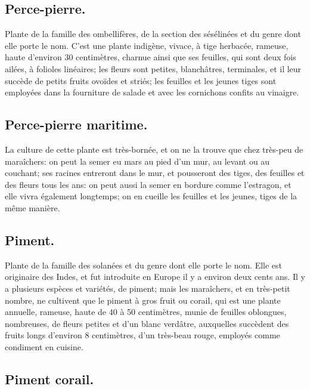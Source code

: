 \documentclass[10pt,a4paper]{book}
\begin{document}
\subsection{Perce-pierre.}

Plante de la famille des ombellifères, de la section des sésélinées et du genre dont elle porte le nom. C'est une plante indigène, vivace, à tige herbacée, rameuse, haute d'environ 30 centimètres, charnue ainsi que ses feuilles, qui sont deux fois ailées, à folioles linéaires; les fleurs sont petites, blanchâtres, terminales, et il leur succède de petits fruits ovoïdes et striés; les feuilles et les jeunes tiges sont employées dans la fourniture de salade et avec les cornichons confits au vinaigre.

\subsection{Perce-pierre maritime.}

La culture de cette plante est très-bornée, et on ne la trouve que chez très-peu de maraîchers: on peut la semer eu mars au pied d'un mur, au levant ou au couchant; ses racines entreront dans le mur, et pousseront des tiges, des feuilles et des fleurs tous les ans: on peut aussi la semer en bordure comme l'estragon, et elle vivra également longtemps; on en cueille les feuilles et les jeunes, tiges de la même manière.

\subsection{Piment.}

Plante de la famille des solanées et du genre dont elle porte le nom. Elle est originaire des Indes, et fut introduite en Europe il y a environ deux cents ans. Il y a plusieurs espèces et variétés, de piment; mais les maraîchers, et en très-petit nombre, ne cultivent que le piment à gros fruit ou corail, qui est une plante annuelle, rameuse, haute de 40 à 50 centimètres, munie de feuilles oblongues, nombreuses, de fleurs petites et d'un blanc verdâtre, auxquelles succèdent des fruits longs d'environ 8 centimètres, d'un très-beau rouge, employés comme condiment en cuisine.

\subsection{Piment corail.}
\end{document}
